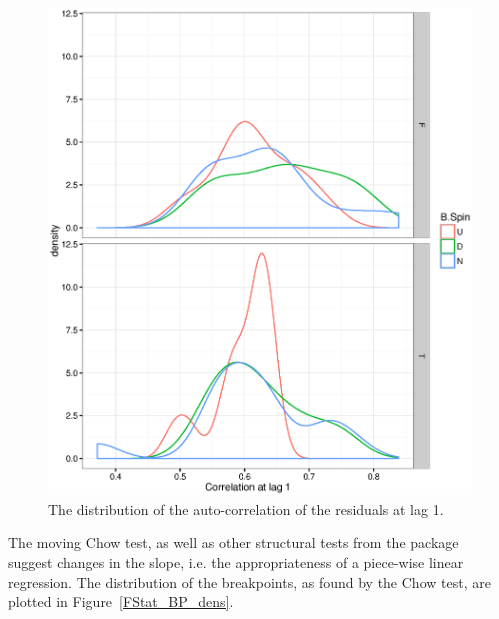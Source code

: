 \documentclass{article}
\begin{document}
\begin{figure}
	\centering
	\includegraphics{ACF1_dens.eps}
	\caption{The distribution of the auto-correlation of the residuals at lag 1.\label{fig:DW2}}
\end{figure}

The moving Chow test, as well as other structural tests from the package~\cite{RStrucchange} suggest changes in the slope, i.e. the appropriateness of a piece-wise linear regression. The distribution of the breakpoints, as found by the Chow test, are plotted in Figure~\ref{FStat_BP_dens}.
\end{document}
